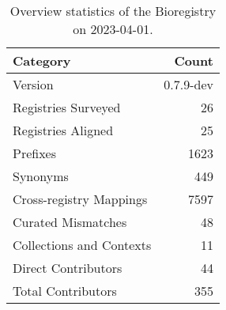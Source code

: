 \begin{table}
\centering
\caption{Overview statistics of the Bioregistry on 2023-04-01.}
\label{tab:bioregistry-summary}
\begin{tabular}{lr}
\toprule
                Category &     Count \\
\midrule
                 Version & 0.7.9-dev \\
     Registries Surveyed &        26 \\
      Registries Aligned &        25 \\
                Prefixes &      1623 \\
                Synonyms &       449 \\
 Cross-registry Mappings &      7597 \\
      Curated Mismatches &        48 \\
Collections and Contexts &        11 \\
     Direct Contributors &        44 \\
      Total Contributors &       355 \\
\bottomrule
\end{tabular}
\end{table}
